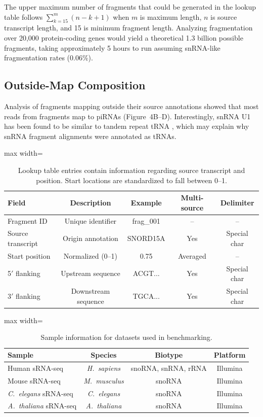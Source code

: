 \documentclass{article}
\begin{document}
The upper maximum number of fragments that could be generated in the lookup table follows $\sum_{k=15}^{m} (n - k + 1)$ when $m$ is maximum length, $n$ is source transcript length, and 15 is minimum fragment length. Analyzing fragmentation over 20,000 protein-coding genes would yield a theoretical 1.3 billion possible fragments, taking approximately 5 hours to run assuming snRNA-like fragmentation rates (0.06\%).

\subsection{Outside-Map Composition}

Analysis of fragments mapping outside their source annotations showed that most reads from fragments map to piRNAs (Figure~4B--D). Interestingly, snRNA U1 has been found to be similar to tandem repeat tRNA \citep{mountweiss1985u1}, which may explain why snRNA fragment alignments were annotated as tRNAs.

\begin{table}[htbp]
\centering
\caption{Lookup table entries contain information regarding source transcript and position. Start locations are standardized to fall between 0--1.}
\label{tab:lookup}
\begin{adjustbox}{max width=\textwidth}
\begin{tabular}{lcccc}
\toprule
Field & Description & Example & Multi-source & Delimiter \\
\midrule
Fragment ID & Unique identifier & frag\_001 & -- & -- \\
Source transcript & Origin annotation & SNORD15A & Yes & Special char \\
Start position & Normalized (0--1) & 0.75 & Averaged & -- \\
5$'$ flanking & Upstream sequence & ACGT... & Yes & Special char \\
3$'$ flanking & Downstream sequence & TGCA... & Yes & Special char \\
\bottomrule
\end{tabular}
\end{adjustbox}
\end{table}

\begin{table}[htbp]
\centering
\caption{Sample information for datasets used in benchmarking.}
\label{tab:samples}
\begin{adjustbox}{max width=\textwidth}
\begin{tabular}{lccc}
\toprule
Sample & Species & Biotype & Platform \\
\midrule
Human sRNA-seq & \textit{H.~sapiens} & snoRNA, snRNA, rRNA & Illumina \\
Mouse sRNA-seq & \textit{M.~musculus} & snoRNA & Illumina \\
\textit{C.~elegans} sRNA-seq & \textit{C.~elegans} & snoRNA & Illumina \\
\textit{A.~thaliana} sRNA-seq & \textit{A.~thaliana} & snoRNA & Illumina \\
\bottomrule
\end{tabular}
\end{adjustbox}
\end{table}
\end{document}
